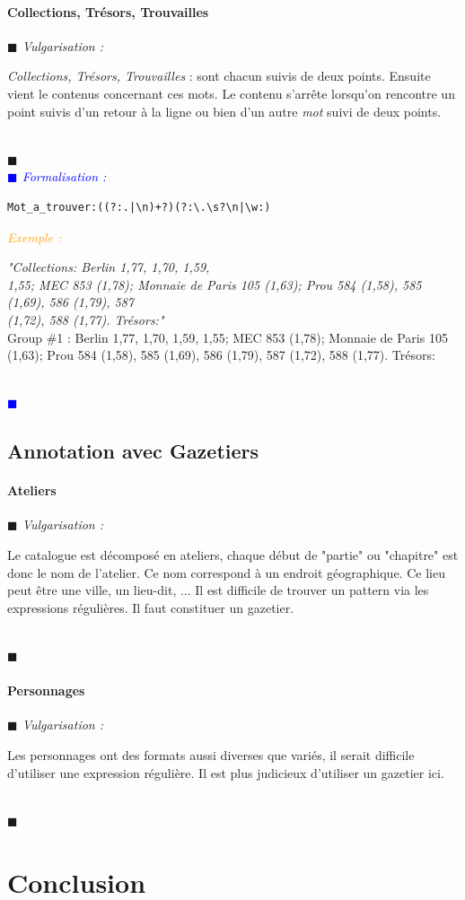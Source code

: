 \documentclass[a4paper, 11pt]{book}
\newenvironment{vulgarisation}
    {
    \textit{\textcolor{dark-blue}{$\blacksquare$  Vulgarisation : \\}}

    }
    {
    ~\\\textcolor{dark-blue}{$\blacksquare$}\\
    }
\newenvironment{formalisation}
    {
    \textit{\textcolor{blue}{$\blacksquare$  Formalisation : \\}}
    }
    {
    ~\\\textcolor{blue}{$\blacksquare$}\\
    }
\newenvironment{exemple}
    {
    \textit{\textcolor{orange}{
    Exemple : \\}}
    }
    {\\
    }
\begin{document}
\subsubsection{Collections, Trésors, Trouvailles}
\begin{vulgarisation}
	\textit{Collections, Trésors, Trouvailles} : sont chacun suivis de deux points. Ensuite vient le contenus concernant ces mots. Le contenu s'arrête lorsqu'on rencontre un point suivis d'un retour à la ligne ou bien d'un autre \textit{mot} suivi de deux points.
\end{vulgarisation}
\begin{formalisation}
	\begin{verbatim}
Mot_a_trouver:((?:.|\n)+?)(?:\.\s?\n|\w:)
	\end{verbatim}
	\begin{exemple}
		\emph{"Collections: Berlin 1,77, 1,70, 1,59, \\
			1,55; MEC 853 (1,78); Monnaie de Paris 105 (1,63); Prou 584 (1,58), 585 (1,69), 586 (1,79), 587 \\
			(1,72), 588 (1,77). Trésors:"}\\
		Group \#1 :  Berlin 1,77, 1,70, 1,59,
		1,55; MEC 853 (1,78); Monnaie de Paris 105 (1,63); Prou 584 (1,58), 585 (1,69), 586 (1,79), 587 (1,72), 588 (1,77). Trésors:
	\end{exemple}
\end{formalisation}


\section{Annotation avec Gazetiers}

\subsubsection{Ateliers}
\begin{vulgarisation}
	Le catalogue est décomposé en ateliers, chaque début de "partie" ou "chapitre" est donc le nom de l'atelier. Ce nom correspond à un endroit géographique. Ce lieu peut être une ville, un lieu-dit, ... Il est difficile de trouver un pattern via les expressions régulières. Il faut constituer un gazetier.
\end{vulgarisation}

\subsubsection{Personnages}
\begin{vulgarisation}
	Les personnages ont des formats aussi diverses que variés, il serait difficile d'utiliser une expression régulière. Il est plus judicieux d'utiliser un gazetier ici. 
\end{vulgarisation}

\chapter{Conclusion}
\end{document}
